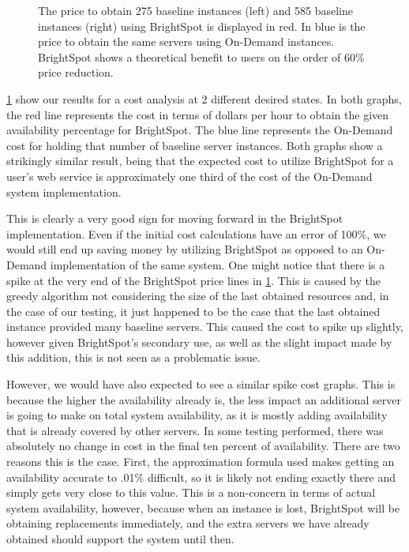 \documentclass[thesis,proposal]{umassthesis}  %
\begin{document}
\begin{figure}
\begin{minipage}{0.49\textwidth}
        \label{Fig:585servercost}
    \end{minipage}
    \caption{The price to obtain 275 baseline instances (left) and 585 baseline instances (right) using BrightSpot is displayed in red. In blue is the price to obtain the same servers using On-Demand instances. BrightSpot shows a theoretical benefit to users on the order of 60\% price reduction.}
    \label{Fig:serverpricing}
\end{figure}

\ref{Fig:serverpricing} show our results for a cost analysis at 2 different desired states. In both graphs, the red line represents the cost in terms of dollars per hour to obtain the given availability percentage for BrightSpot. The blue line represents the On-Demand cost for holding that number of baseline server instances. Both graphs show a strikingly similar result, being that the expected cost to utilize BrightSpot for a user's web service is approximately one third of the cost of the On-Demand system implementation. \par

This is clearly a very good sign for moving forward in the BrightSpot implementation. Even if the initial cost calculations have an error of 100\%, we would still end up saving money by utilizing BrightSpot as opposed to an On-Demand implementation of the same system. One might notice that there is a spike at the very end of the BrightSpot price lines in \ref{Fig:serverpricing}. This is caused by the greedy algorithm not considering the size of the last obtained resources and, in the case of our testing, it just happened to be the case that the last obtained instance provided many baseline servers. This caused the cost to spike up slightly, however given BrightSpot's secondary use, as well as the slight impact made by this addition, this is not seen as a problematic issue.\par

However, we would have also expected to see a similar spike cost graphs. This is because the higher the availability already is, the less impact an additional server is going to make on total system availability, as it is mostly adding availability that is already covered by other servers. In some testing performed, there was absolutely no change in cost in the final ten percent of availability. There are two reasons this is the case. First, the approximation formula used makes getting an availability accurate to .01\% difficult, so it is likely not ending exactly there and simply gets very close to this value. This is a non-concern in terms of actual system availability, however, because when an instance is lost, BrightSpot will be obtaining replacements immediately, and the extra servers we have already obtained should support the system until then.\par
\end{document}

